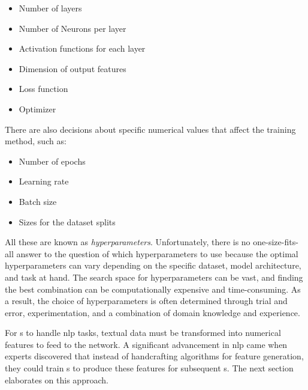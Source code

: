 \begin{itemize}
    \item Number of layers
    \item Number of Neurons per layer
    \item Activation functions for each layer
    \item Dimension of output features
    \item Loss function
    \item Optimizer
\end{itemize}

There are also decisions about specific numerical values that affect the training method, such as:


\begin{itemize}
    \item Number of epochs
    \item Learning rate
    \item Batch size
    \item Sizes for the dataset splits
\end{itemize}

All these are known as \emph{hyperparameters}. Unfortunately, there is no one-size-fits-all answer to the question of which hyperparameters to use because the optimal hyperparameters can vary depending on the specific dataset, model architecture, and task at hand. The search space for hyperparameters can be vast, and finding the best combination can be computationally expensive and time-consuming. As a result, the choice of hyperparameters is often determined through trial and error, experimentation, and a combination of domain knowledge and experience.




\label{02_nn_nlp_tasks}

For \neuralNetwork{}s to handle \gls{nlp} tasks, textual data must be transformed into numerical features to feed to the network. 
A significant advancement in \gls{nlp} came when experts discovered that instead of handcrafting algorithms for feature generation, they could train \neuralNetwork{}s to produce these features for subsequent \neuralNetwork{}s.
The next section elaborates on this approach.



